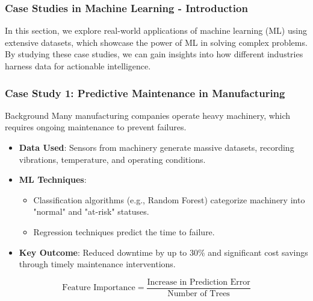 \documentclass[aspectratio=169]{beamer}
\begin{document}
\begin{frame}[fragile]
    \frametitle{Case Studies in Machine Learning - Introduction}
    In this section, we explore real-world applications of machine learning (ML) using extensive datasets, which showcase the power of ML in solving complex problems. 
    \\[1em]
    By studying these case studies, we can gain insights into how different industries harness data for actionable intelligence.
\end{frame}

\begin{frame}[fragile]
    \frametitle{Case Study 1: Predictive Maintenance in Manufacturing}
    \begin{block}{Background}
        Many manufacturing companies operate heavy machinery, which requires ongoing maintenance to prevent failures.
    \end{block}
    
    \begin{itemize}
        \item \textbf{Data Used}: Sensors from machinery generate massive datasets, recording vibrations, temperature, and operating conditions.
        \item \textbf{ML Techniques}: 
            \begin{itemize}
                \item Classification algorithms (e.g., Random Forest) categorize machinery into "normal" and "at-risk" statuses.
                \item Regression techniques predict the time to failure.
            \end{itemize}
        \item \textbf{Key Outcome}: Reduced downtime by up to 30\% and significant cost savings through timely maintenance interventions.
    \end{itemize}
    
    \begin{equation}
        \text{Feature Importance} = \frac{\text{Increase in Prediction Error}}{\text{Number of Trees}}
    \end{equation}
\end{frame}
\end{document}
